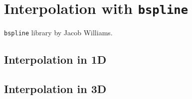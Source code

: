 \chapter{Interpolation with \texttt{bspline}}

\texttt{bspline} library by Jacob Williams.

\section{Interpolation in 1D}


\section{Interpolation in 3D}
